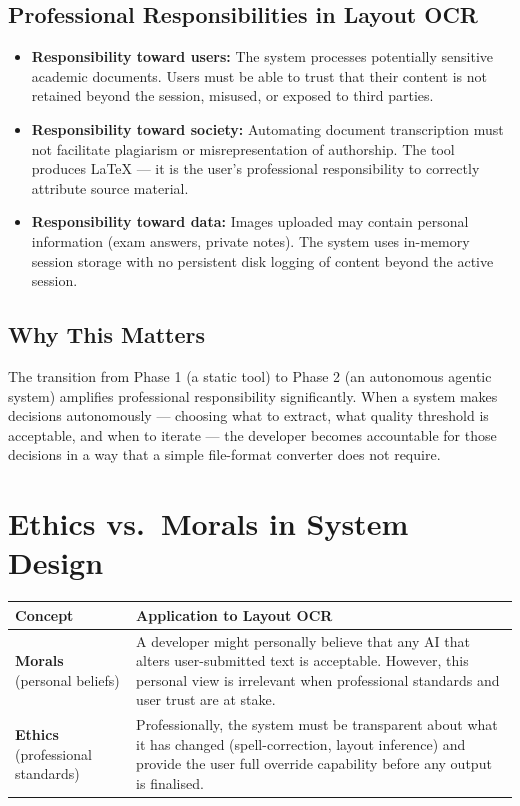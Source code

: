 \documentclass[12pt,a4paper]{article}
\begin{document}
\subsection{Professional Responsibilities in Layout OCR}

\begin{itemize}[noitemsep]
  \item \textbf{Responsibility toward users:} The system processes potentially sensitive academic
    documents. Users must be able to trust that their content is not retained beyond the session,
    misused, or exposed to third parties.

  \item \textbf{Responsibility toward society:} Automating document transcription must not
    facilitate plagiarism or misrepresentation of authorship. The tool produces \LaTeX{} — it is
    the user's professional responsibility to correctly attribute source material.

  \item \textbf{Responsibility toward data:} Images uploaded may contain personal information
    (exam answers, private notes). The system uses in-memory session storage with no persistent
    disk logging of content beyond the active session.
\end{itemize}

\subsection{Why This Matters}
The transition from Phase 1 (a static tool) to Phase 2 (an autonomous agentic system) amplifies
professional responsibility significantly. When a system makes decisions autonomously — choosing
what to extract, what quality threshold is acceptable, and when to iterate — the developer becomes
accountable for those decisions in a way that a simple file-format converter does not require.


\section{Ethics vs.\ Morals in System Design}

\begin{center}
\begin{tabular}{p{5cm}p{8cm}}
  \toprule
  \textbf{Concept} & \textbf{Application to Layout OCR} \\
  \midrule
  \textbf{Morals} (personal beliefs) &
    A developer might personally believe that any AI that alters user-submitted text is
    acceptable. However, this personal view is irrelevant when professional standards and user
    trust are at stake. \\[0.6em]
  \textbf{Ethics} (professional standards) &
    Professionally, the system must be transparent about what it has changed (spell-correction,
    layout inference) and provide the user full override capability before any output is
    finalised. \\
  \bottomrule
\end{tabular}
\end{center}
\end{document}
